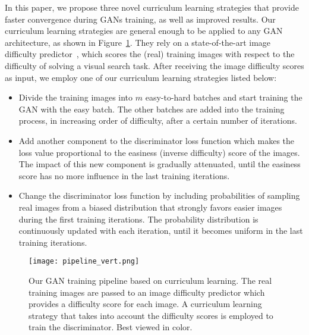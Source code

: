 \documentclass[10pt,twocolumn,letterpaper]{article}
\begin{document}
In this paper, we propose three novel curriculum learning strategies that provide faster convergence during GANs training, as well as improved results. Our curriculum learning strategies are general enough to be applied to any GAN architecture, as shown in Figure~\ref{fig_pipeline}. They rely on a state-of-the-art image difficulty predictor~\cite{Ionescu-CVPR-2016}, which scores the (real) training images with respect to the difficulty of solving a visual search task. After receiving the image difficulty scores as input, we employ one of our curriculum learning strategies listed below:
\begin{itemize}
\vspace{-0.15cm}
\item Divide the training images into $m$ easy-to-hard batches and start training the GAN with the easy batch. The other batches are added into the training process, in increasing order of difficulty, after a certain number of iterations.
\vspace{-0.15cm}
\item Add another component to the discriminator loss function which makes the loss value proportional to the easiness (inverse difficulty) score of the images. The impact of this new component is gradually attenuated, until the easiness score has no more influence in the last training iterations.
\vspace{-0.15cm}
\item Change the discriminator loss function by including probabilities of sampling real images from a biased distribution that strongly favors easier images during the first training iterations. The probability distribution is continuously updated with each iteration, until it becomes uniform in the last training iterations.
\end{itemize}
\vspace{-0.15cm}

\begin{figure}[!t]
\begin{center}
\texttt{[image: pipeline\_vert.png]}
\end{center}
\vspace*{-0.4cm}
\caption{Our GAN training pipeline based on curriculum learning. The real training images are passed to an image difficulty predictor which provides a difficulty score for each image. A curriculum learning strategy that takes into account the difficulty scores is employed to train the discriminator. Best viewed in color.}
\label{fig_pipeline}
\vspace*{-0.5cm}
\end{figure}
\end{document}
